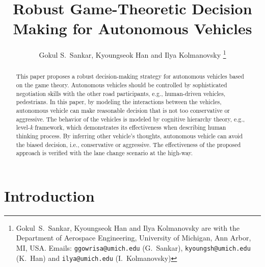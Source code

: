 \documentclass[10pt,journal]{IEEEtran}
\begin{document}
	
	\title{Robust Game-Theoretic Decision Making for Autonomous Vehicles}

	\thispagestyle{empty}

	\author{
		Gokul S.~Sankar,  Kyoungseok Han and Ilya Kolmanovsky%
		\thanks{Gokul~S.~Sankar,  Kyoungseok Han and Ilya Kolmanovsky are with the Department of Aerospace Engineering, University of Michigan, Ann Arbor, MI, USA. Emails: {\tt\small ggowrisa@umich.edu} (G.~Sankar), 
			{\tt\small kyoungsh@umich.edu} (K.~Han) and  {\tt\small ilya@umich.edu} (I.~Kolmanovsky) }%
	}

	\maketitle
	
	
	
	\begin{abstract}
	This paper proposes a robust decision-making strategy for autonomous vehicles based on the game theory. Autonomous vehicles should be controlled by sophisticated negotiation skills with the other road participants, e.g., human-driven vehicles, pedestrians. In this paper, by modeling the interactions between the vehicles, autonomous vehicle can make reasonable decision that is not too conservative or aggressive. The behavior of the vehicles is modeled by cognitive hierarchy theory, e.g., level-\textit{k} framework, which demonstrates its effectiveness when describing human thinking process. By inferring other vehicle's thoughts, autonomous vehicle can avoid the biased decision, i.e., conservative or aggressive. The effectiveness of the proposed approach is verified with the lane change scenario at the high-way.
	
	\end{abstract}
	
	

	
	\section{Introduction}
	\label{sec:intro}
\end{document}
